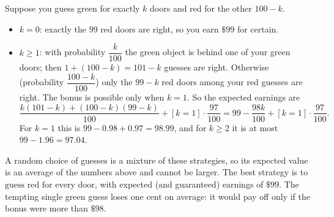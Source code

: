 Suppose you guess green for exactly $k$ doors and red for the other $100-k$.
\begin{itemize}
\item $k=0$: exactly the $99$ red doors are right, so you earn $\$99$ for certain.
\item $k\ge1$: with probability $\dfrac{k}{100}$ the green object is behind one of your green doors; then $1+(100-k)=101-k$ guesses are right. Otherwise (probability $\dfrac{100-k}{100}$) only the $99-k$ red doors among your red guesses are right. The bonus is possible only when $k=1$. So the expected earnings are
\[\dfrac{k(101-k)+(100-k)(99-k)}{100}+[k=1]\cdot\dfrac{97}{100}=99-\dfrac{98k}{100}+[k=1]\cdot\dfrac{97}{100}.\]
For $k=1$ this is $99-0.98+0.97=98.99$, and for $k\ge2$ it is at most $99-1.96=97.04$.
\end{itemize}
A random choice of guesses is a mixture of these strategies, so its expected value is an average of the numbers above and cannot be larger. The best strategy is to $\boxed{\text{guess red for every door}}$, with expected (and guaranteed) earnings of $\boxed{\$99}$. The tempting single green guess loses one cent on average: it would pay off only if the bonus were more than $\$98$.
